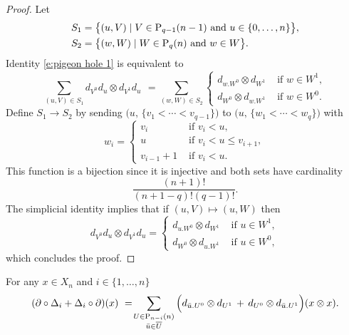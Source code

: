 \begin{proof}
	Let
	\begin{align*}
	& S_1 = \big\{ (u, V)\mid V \in \P_{q-1}(n-1) \text{ and } u \in \{0,\dots,n\} \big\}, \\
	& S_2 = \big\{ (w, W)\mid W \in \P_{q}(n) \text{ and } w \in W \big\}.
	\end{align*}
	Identity \eqref{e:pigeon hole 1} is equivalent to
	\begin{equation} \label{e:pigeon hole 2}
	\sum_{(u, V) \in S_1} d_{V^0}d_u \otimes d_{V^1}d_u \ \, = \!
	\sum_{(w, W) \in S_2}
	\begin{cases}
	d_{w.W^0} \otimes d_{W^1} & \text{ if } w \in W^1, \\
	d_{W^0} \otimes d_{w.W^1} & \text{ if } w \in W^0.
	\end{cases}
	\end{equation}
	Define $S_1 \to S_2$ by sending $\big(u,\, \{v_1 < \cdots < v_{q-1}\} \big)$ to $\big(u,\, \{w_1 < \cdots < w_{q}\} \big)$ with
	\begin{equation*}
	w_i =
	\begin{cases}
	v_i & \text{ if } v_i < u, \\
	u & \text{ if } v_i < u \leq v_{i+1}, \\
	v_{i-1}+1 & \text{ if } v_i < u.
	\end{cases}
	\end{equation*}
	This function is a bijection since it is injective and both sets have cardinality
	\begin{equation*}
	\frac{(n+1)!}{(n+1-q)!(q-1)!}.
	\end{equation*}
	The simplicial identity implies that if $(u, V) \mapsto (u, W)$ then
	\begin{equation*}
	d_{V^0}d_u \otimes d_{V^1}d_u =
	\begin{cases}
	d_{u.W^0} \otimes d_{W^1} & \text{ if } u \in W^1, \\
	d_{W^0} \otimes d_{u.W^1} & \text{ if } u \in W^0,
	\end{cases}
	\end{equation*}
	which concludes the proof.
\end{proof}

\begin{lemma} \label{l:boundary of Delta}
	For any $x \in X_n$ and $i \in \{1, \dots, n\}$
	\begin{equation} \label{e:boundary of Delta}
	(\partial \circ \Delta_i + \Delta_i \circ \partial)(x) \ = \!
	\sum_{\substack{U \in \P_{n-i}(n) \\ \bu \in \overline{U}}} \Big( d_{\bu.U^0} \otimes d_{U^1} \, + \, d_{U^0} \otimes d_{\bu.U^1} \Big) (x \otimes x).
	\end{equation}
\end{lemma}

